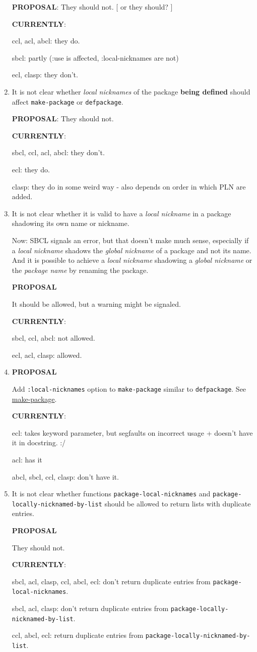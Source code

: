 \documentclass[11pt]{article}
\begin{document}
\begin{enumerate}
\textbf{PROPOSAL}:
They should not.  [ or they should? ]

\textbf{CURRENTLY}:

ccl, acl, abcl: they do.

sbcl: partly (:use is affected, :local-nicknames are not)

ecl, clasp: they don't.

\item It is not clear whether \emph{local nicknames} of the package \textbf{being defined}
should affect \texttt{make-package} or \texttt{defpackage}.

\textbf{PROPOSAL}:
They should not.

\textbf{CURRENTLY}:

sbcl, ccl, acl, abcl: they don't.

ecl: they do.

clasp: they do in some weird way - also depends on order in which PLN are
added.

\item It is not clear whether it is valid to have a \emph{local nickname} in a package
shadowing its own name or nickname.

Now: SBCL signals an error, but that doesn't make much sense, especially if
a \emph{local nickname} shadows the \emph{global nickname} of a package and not its
name. And it is possible to achieve a \emph{local nickname} shadowing a \emph{global
nickname} or the \emph{package name} by renaming the package.

\textbf{PROPOSAL}

It should be allowed, but a warning might be signaled.

\textbf{CURRENTLY}:

sbcl, ccl, abcl: not allowed.

ecl, acl, clasp: allowed.
\item \textbf{PROPOSAL}

Add \texttt{:local-nicknames} option to \texttt{make-package} similar to \texttt{defpackage}.
See \hyperref[sec:org8c9cb8f]{make-package}.

\textbf{CURRENTLY}:

ecl: takes keyword parameter, but segfaults on incorrect usage + doesn't
have it in docstring. :/

acl: has it

abcl, sbcl, ccl, clasp: don't have it.
\item It is not clear whether functions \texttt{package-local-nicknames} and
\texttt{package-locally-nicknamed-by-list} should be allowed to return
lists with duplicate entries.

\textbf{PROPOSAL}

They should not.

\textbf{CURRENTLY}:

sbcl, acl, clasp, ccl, abcl, ecl: don't return duplicate entries from \texttt{package-local-nicknames}.

sbcl, acl, clasp: don't return duplicate entries from \texttt{package-locally-nicknamed-by-list}.

ccl, abcl, ecl: return duplicate entries from \texttt{package-locally-nicknamed-by-list}.
\end{enumerate}
\end{document}
